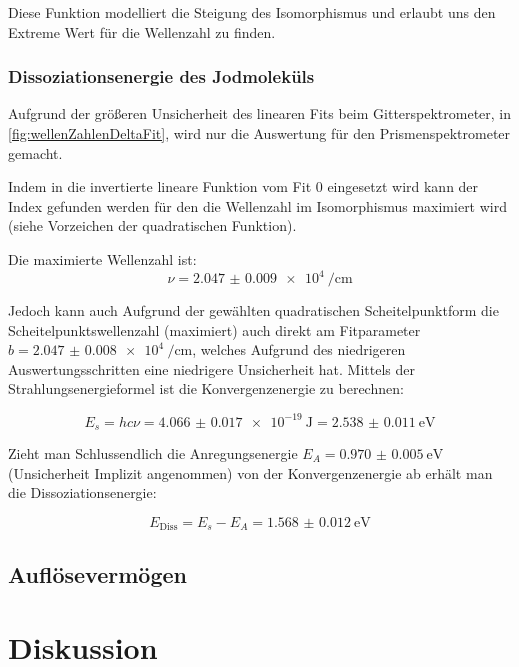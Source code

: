 \documentclass[12pt,english,ngerman]{scrartcl}
\begin{document}
Diese Funktion modelliert die Steigung des Isomorphismus und erlaubt uns den
Extreme Wert für die Wellenzahl zu finden.

\subsubsection{Dissoziationsenergie des Jodmoleküls}
Aufgrund der größeren Unsicherheit des linearen Fits beim Gitterspektrometer,
in \autoref{fig:wellenZahlenDeltaFit}, wird nur die Auswertung für den
Prismenspektrometer gemacht.

Indem in die invertierte lineare Funktion vom Fit 0 eingesetzt wird kann der
Index gefunden werden für den die Wellenzahl im Isomorphismus maximiert wird
(siehe Vorzeichen der quadratischen Funktion). 

Die maximierte Wellenzahl ist:
\begin{equation}
	\nu = \SI{2.047(9)e4}{\per\cm}
\end{equation}

Jedoch kann auch Aufgrund der gewählten quadratischen Scheitelpunktform die
Scheitelpunktswellenzahl (maximiert) auch direkt am Fitparameter $b =
	\SI{2.047(8)e4}{\per\cm}$, welches Aufgrund des niedrigeren
Auswertungsschritten eine niedrigere Unsicherheit hat. Mittels der
Strahlungsenergieformel ist die Konvergenzenergie zu berechnen:

\begin{equation}
	E_s = h c \nu = \SI{4.066(17)e-19}{\joule} = \SI{2.538(11)}{\electronvolt}
\end{equation}

Zieht man Schlussendlich die Anregungsenergie
$E_A=\SI{0.970(5)}{\electronvolt}$ (Unsicherheit Implizit angenommen) von der
Konvergenzenergie ab erhält man die Dissoziationsenergie:

\begin{equation}
	E_\text{Diss} = E_s - E_A = \SI{1.568(12)}{\electronvolt}
\end{equation}

\subsection{Auflösevermögen}


\section{Diskussion}\label{sec:disk}
\end{document}
